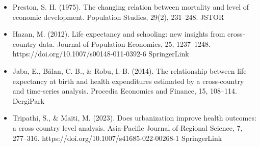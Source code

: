 \documentclass[
  11pt,
]{article}
\begin{document}
\begin{itemize}
\item
  Preston, S. H. (1975). The changing relation between mortality and
  level of economic development. Population Studies, 29(2), 231--248.
  JSTOR
\item
  Hazan, M. (2012). Life expectancy and schooling: new insights from
  cross‐country data. Journal of Population Economics, 25, 1237--1248.
  https://doi.org/10.1007/s00148-011-0392-6 SpringerLink
\item
  Jaba, E., Bălan, C. B., \& Robu, I.-B. (2014). The relationship
  between life expectancy at birth and health expenditures estimated by
  a cross‐country and time‐series analysis. Procedia Economics and
  Finance, 15, 108--114. DergiPark
\item
  Tripathi, S., \& Maiti, M. (2023). Does urbanization improve health
  outcomes: a cross country level analysis. Asia‐Pacific Journal of
  Regional Science, 7, 277--316.
  https://doi.org/10.1007/s41685-022-00268-1 SpringerLink
\end{itemize}
\end{document}
